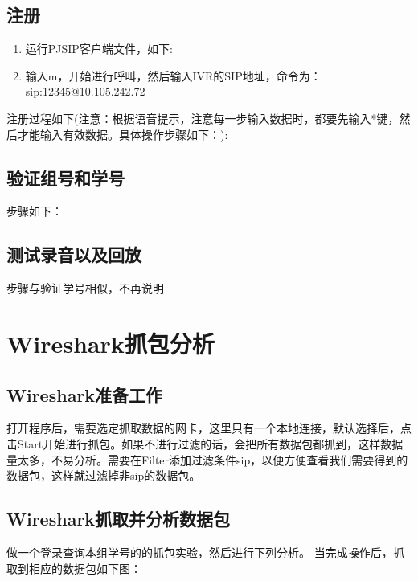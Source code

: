 \documentclass[a4paper,AutoFakeBold,oneside,12pt]{book}
\begin{document}
\subsection{注册}

\begin{enumerate}
\item 运行PJSIP客户端文件，如下:


\item 输入m，开始进行呼叫，然后输入IVR的SIP地址，命令为：sip:12345@10.105.242.72
\end{enumerate}

注册过程如下(注意：根据语音提示，注意每一步输入数据时，都要先输入*键，然后才能输入有效数据。具体操作步骤如下：):


\subsection{验证组号和学号}
步骤如下：


\subsection{测试录音以及回放}
步骤与验证学号相似，不再说明

\section{Wireshark抓包分析}
\subsection{Wireshark准备工作}
打开程序后，需要选定抓取数据的网卡，这里只有一个本地连接，默认选择后，点击Start开始进行抓包。如果不进行过滤的话，会把所有数据包都抓到，这样数据量太多，不易分析。需要在Filter添加过滤条件sip，以便方便查看我们需要得到的数据包，这样就过滤掉非sip的数据包。
\subsection{Wireshark抓取并分析数据包}
做一个登录查询本组学号的的抓包实验，然后进行下列分析。
当完成操作后，抓取到相应的数据包如下图：

\end{document}
